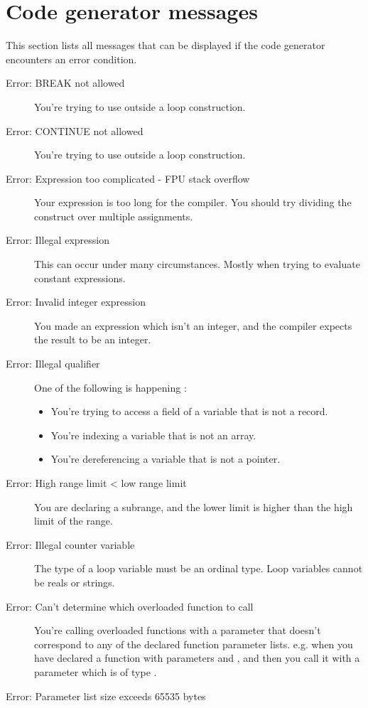 \section{Code generator messages}
 This section lists all messages that can be displayed if the code
 generator encounters an error condition.
 \begin{description}
\item [Error: BREAK not allowed]
 You're trying to use  outside a loop construction.
\item [Error: CONTINUE not allowed]
 You're trying to use  outside a loop construction.
\item [Error: Expression too complicated - FPU stack overflow]
 Your expression is too long for the compiler. You should try dividing the
 construct over multiple assignments.
\item [Error: Illegal expression]
 This can occur under many circumstances. Mostly when trying to evaluate
 constant expressions.
\item [Error: Invalid integer expression]
 You made an expression which isn't an integer, and the compiler expects the
 result to be an integer.
\item [Error: Illegal qualifier]
 One of the following is happening :
 \begin{itemize}
 \item You're trying to access a field of a variable that is not a record.
 \item You're indexing a variable that is not an array.
 \item You're dereferencing a variable that is not a pointer.
 \end{itemize}
\item [Error: High range limit < low range limit]
 You are declaring a subrange, and the lower limit is higher than the high
 limit of the range.
\item [Error: Illegal counter variable]
 The type of a  loop variable must be an ordinal type.
 Loop variables cannot be reals or strings.
\item [Error: Can't determine which overloaded function to call]
 You're calling overloaded functions with a parameter that doesn't correspond
 to any of the declared function parameter lists. e.g. when you have declared
 a function with parameters  and , and then you call
 it with a parameter which is of type .
\item [Error: Parameter list size exceeds 65535 bytes]

\end{description}
